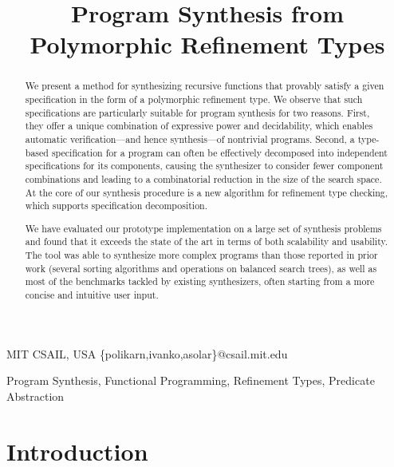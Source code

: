 \documentclass[10pt,preprint]{sigplanconf-pldi16}
\theoremstyle{definition}
\newif\iflong
\begin{document}
\setlength{\pdfpageheight}{\paperheight}
\setlength{\pdfpagewidth}{\paperwidth}

\title{Program Synthesis from Polymorphic Refinement Types}
\iflong
\subtitle{Extended Version}
\fi

           {MIT CSAIL, USA}
           {\{polikarn,ivanko,asolar\}@csail.mit.edu}

\maketitle

\begin{abstract}
We present a method for synthesizing recursive functions that provably satisfy a given specification in the form of a polymorphic refinement type.
We observe that such specifications are particularly suitable for program synthesis for two reasons.
First, they offer a unique combination of expressive power and decidability,
which enables automatic verification---and hence synthesis---of nontrivial programs.
Second, a type-based specification for a program can often be effectively decomposed into independent specifications for its components,
causing the synthesizer to consider fewer component combinations
and leading to a combinatorial reduction in the size of the search space.
At the core of our synthesis procedure is a new algorithm for refinement type checking,
which supports specification decomposition. 

We have evaluated our prototype implementation on a large set of synthesis problems and found 
that it exceeds the state of the art in terms of both scalability and usability. 
The tool was able to synthesize more complex programs than those reported in prior work 
(several sorting algorithms and operations on balanced search trees),
as well as most of the benchmarks tackled by existing synthesizers, 
often starting from a more concise and intuitive user input. 
\end{abstract}





\keywords
Program Synthesis, Functional Programming, Refinement Types, Predicate Abstraction





\section{Introduction}\label{sec:intro}
\end{document}
